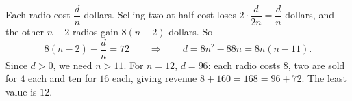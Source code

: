 Each radio cost $\dfrac dn$ dollars. Selling two at half cost loses $2\cdot\dfrac{d}{2n}=\dfrac dn$ dollars, and the other $n-2$ radios gain $8(n-2)$ dollars. So
\[8(n-2)-\dfrac dn=72\qquad\Longrightarrow\qquad d=8n^2-88n=8n(n-11).\]
Since $d>0$, we need $n>11$. For $n=12$, $d=96$: each radio costs $8$, two are sold for $4$ each and ten for $16$ each, giving revenue $8+160=168=96+72$. The least value is $\boxed{12}$.

